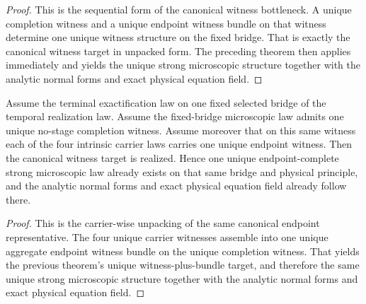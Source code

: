 \begin{proof}
This is the sequential form of the canonical witness bottleneck. A unique
completion witness and a unique endpoint witness bundle on that witness
determine one unique witness structure on the fixed bridge. That is exactly the canonical
witness target in unpacked form. The preceding theorem then applies
immediately and yields the unique strong microscopic structure together with the
analytic normal forms and exact physical equation field.
\end{proof}

\begin{theorem}
\label{thm:canonical-completion-witness-lane-target-implies-canonical-flagship-witness-target}
Assume the terminal exactification law on one fixed selected bridge of the
temporal realization law. Assume the fixed-bridge microscopic law admits one
unique no-stage completion witness. Assume moreover that on this same witness
each of the four intrinsic carrier laws carries one unique endpoint witness. Then the
canonical witness target is realized. Hence one unique
endpoint-complete strong microscopic law already exists on that same bridge and
physical principle, and the analytic normal forms and exact physical
equation field already follow there.
\end{theorem}

\begin{proof}
This is the carrier-wise unpacking of the same canonical endpoint representative. The
four unique carrier witnesses assemble into one unique aggregate endpoint witness
bundle on the unique completion witness. That yields the previous theorem's
unique witness-plus-bundle target, and therefore the same unique strong
microscopic structure together with the analytic normal forms and exact
physical equation field.
\end{proof}

